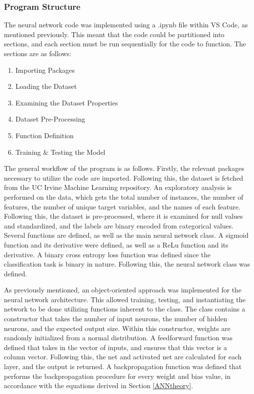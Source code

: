 \documentclass[a4paper]{article}
\begin{document}
\subsubsection{Program Structure}

The neural network code was implemented using a .ipynb file within VS Code, as mentioned previously. This meant that the code could be partitioned into sections, and each section must be run sequentially for the code to function. The sections are as follows:

\begin{enumerate}
    \item Importing Packages
    \item Loading the Dataset
    \item Examining the Dataset Properties
    \item Dataset Pre-Processing
    \item Function Definition
    \item Training \& Testing the Model
\end{enumerate}

The general workflow of the program is as follows. Firstly, the relevant packages necessary to utilize the code are imported. Following this, the dataset is fetched from the UC Irvine Machine Learning repository. An exploratory analysis is performed on the data, which gets the total number of instances, the number of features, the number of unique target variables, and the names of each feature. Following this, the dataset is pre-processed, where it is examined for null values and standardized, and the labels are binary encoded from categorical values. Several functions are defined, as well as the main neural network class. A sigmoid function and its derivative were defined, as well as a ReLu function and its derivative. A binary cross entropy loss function was defined since the classification task is binary in nature. Following this, the neural network class was defined.

As previously mentioned, an object-oriented approach was implemented for the neural network architecture. This allowed training, testing, and instantiating the network to be done utilizing functions inherent to the class. The class contains a constructor that takes the number of input neurons, the number of hidden neurons, and the expected output size. Within this constructor, weights are randomly initialized from a normal distribution. A feedforward function was defined that takes in the vector of inputs, and ensures that this vector is a column vector. Following this, the net and activated net are calculated for each layer, and the output is returned. A backpropagation function was defined that performs the backpropagation procedure for every weight and bias value, in accordance with the equations derived in Section \ref{ANNtheory}.
\end{document}
